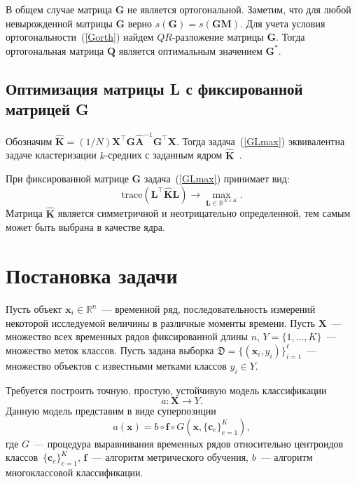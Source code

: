 В общем случае матрица $\mathbf{G}$ не является ортогональной.
Заметим, что для любой невырожденной матрицы $\mathbf{G}$ верно $s(\mathbf{G}) = s(\mathbf{G M})$.
Для учета условия ортогональности~(\ref{Gorth}) найдем $QR$-разложение матрицы $\mathbf{G}$.
Тогда ортогональная матрица $\mathbf{Q}$ является оптимальным значением $\mathbf{G}^*$.

\subsection{Оптимизация матрицы L с фиксированной матрицей G}
\begin{theorem}
	Обозначим $\hat{\mathbf{K}} = (1/N)\mathbf{X}^{\top} \mathbf{G} \hat{\mathbf{A}}^{-1} \mathbf{G}^{\top} \mathbf{X}$.
	Тогда задача~(\ref{GLmax}) эквивалентна задаче кластеризации $k$-средних с заданным ядром $\hat{\mathbf{K}}$~\cite{shawe2004kernel}.
\end{theorem}

При фиксированной матрице $\mathbf{G}$ задача~(\ref{GLmax}) принимает вид:
\begin{equation*}
\text{trace} (\mathbf{L}^{\top} \hat{\mathbf{K}} \mathbf{L}) \to \max_{\mathbf{L} \in \mathbb{R}^{N \times K}}.
\end{equation*}
Матрица $\hat{\mathbf{K}}$ является симметричной и неотрицательно определенной, тем самым может быть выбрана в качестве ядра.



\section{Постановка задачи}
Пусть объект $\mathbf{x}_i \in \mathbb{R}^n$~--- временной ряд, последовательность измерений некоторой исследуемой величины в различные моменты времени.
Пусть $\mathbf{X}$~--- множество всех временных рядов фиксированной длины $n$, $Y = \{1, \dots, K\}$~--- множество меток классов.
Пусть задана выборка $\mathfrak{D} = \{(\mathbf{x}_i, y_i)\}_{i=1}^\ell$~--- множество объектов с известными метками классов $y_i \in Y$.

Требуется построить точную, простую, устойчивую модель классификации
\[
a: \mathbf{X} \to Y.
\]
Данную модель представим в виде суперпозиции
\begin{equation}
\label{ch4:eq:classifiers}
a(\mathbf{x}) = b \circ \mathbf{f} \circ G(\mathbf{x}, \{\mathbf{c}_e\}_{e = 1} ^ K),
\end{equation}
где $G$~--- процедура выравнивания временных рядов относительно центроидов классов~$\{\mathbf{c}_e\}_{e = 1} ^ K$, $\mathbf{f}$~--- алгоритм метрического обучения, $b$~--- алгоритм многоклассовой классификации.

